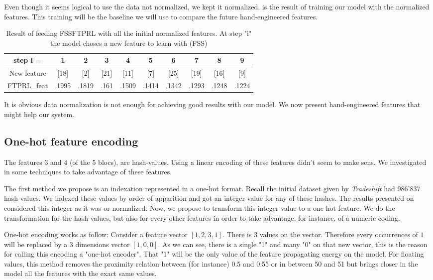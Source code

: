 		Even though it seems logical to use the data not normalized, we kept it normalized.  is the result of training our model with the normalized features. This training will be the baseline we will use to compare the future hand-engineered features.
		\begin{table}
			\centering
			\begin{tabular}{c|c|c|c|c|c|c|c|c|c}
				step i = & 1  & 2 & 3 & 4 & 5 & 6 & 7 & 8 & 9\\
				\hline
				New feature 			 & [18] & [2] & [21] & [11] & [7] & [25] & [19] & [16] & [9] \\
				FTPRL\_feat	&  .1995 & .1819 & .161 & .1509 & .1414 & .1342 & .1293 & .1248 & .1224   \\
			\end{tabular}
			\caption{Result of feeding FSSFTPRL with all the initial normalized features. At step "i" the model choses a new feature to learn with (FSS) }
			\label{tab:FTPRL_feat}
		\end{table}

		It is obvious data normalization is not enough for achieving good results with our model. We now present hand-engineered features that might help our system.


	\subsection{One-hot feature encoding}
	
		The features 3 and 4 (of the 5 blocs), are hash-values. Using a linear encoding of these features didn't seem to make sens. We investigated in some techniques to take advantage of these features.

		The first method we propose is an indexation represented in a one-hot format. Recall the initial dataset given by \textit{Tradeshift} had 986'837 hash-values. We indexed these values by order of apparition and got an integer value for any of these hashes. The results presented on  considered this integer as it was or normalized. Now, we propose to transform this integer value to a one-hot feature. We do the transformation for the hash-values, but also for every other features in order to take advantage, for instance, of a numeric coding. 

		One-hot encoding works as follow: Consider a feature vector $[1,2,3,1]$. There is $3$ values on the vector. Therefore every occurrences of $1$ will be replaced by a 3 dimensions vector $[1,0,0]$. As we can see, there is a single "1" and many "0" on that new vector, this is the reason for calling this encoding a "one-hot encoder". That "1" will be the only value of the feature propagating energy on the model. For floating values, this method removes the proximity relation between (for instance) 0.5 and 0.55 or in between 50 and 51 but brings closer in the model all the features with the exact same values. 

